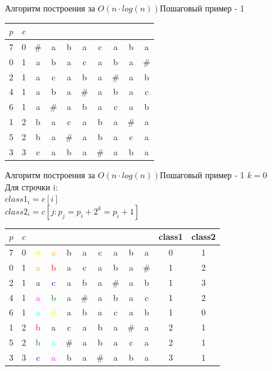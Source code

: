 \documentclass[10pt]{beamer}
\begin{document}
\begin{frame}[fragile]{Алгоритм построения за $O(n \cdot log(n))$}{Пошаговый пример - 1}
\begin{center}
\begin{tabular}{ c|c|cccccccc } 
 $p$ & $c$ & & & & & & & & \\ 
  \hline
 7 & 0 & \# & a & b & a & c & a & b & a \\ 
 \hline
 0 & 1 & a & b & a & c & a & b & a & \# \\ 
 \hline
 2 & 1 & a & c & a & b & a & \# & a & b \\ 
 \hline
 4 & 1 & a & b & a & \# & a & b & a & c \\ 
 \hline
 6 & 1 & a & \# & a & b & a & c & a & b \\ 
 \hline
 1 & 2 & b & a & c & a & b & a & \# & a \\ 
 \hline
 5 & 2 & b & a & \# & a & b & a & c & a \\ 
 \hline
 3 & 3 & c & a & b & a & \# & a & b & a \\ 
\end{tabular}
\end{center}
\end{frame}

\begin{frame}[fragile]{Алгоритм построения за $O(n \cdot log(n))$}{Пошаговый пример - 1}
$k = 0$\\
Для строчки i: \\
$class1_i = c[i]$ \\
$class2_i = c[j: p_j=p_i+2^k=p_i+1]$ \\
\begin{center}
\begin{tabular}{ c|c|cccccccc|c|c } 
 $p$ & $c$ & & & & & & & & & class1 & class2 \\ 
  \hline
 7 & 0 & \textcolor{yellow}{\#} & \textcolor{orange}{a} & b & a & c & a & b & a & 0 & 1 \\ 
 \hline
 0 & 1 & \textcolor{orange}{a} & \textcolor{red}{b} & a & c & a & b & a & \# & 1 & 2 \\ 
 \hline
 2 & 1 & a & \textcolor{blue}{c} & a & b & a & \# & a & b & 1 & 3 \\ 
 \hline
 4 & 1 & \textcolor{magenta}{a} & \textcolor{green}{b} & a & \# & a & b & a & c & 1 & 2 \\ 
 \hline
 6 & 1 & \textcolor{cyan}{a} & \textcolor{yellow}{\#} & a & b & a & c & a & b & 1 & 0 \\ 
 \hline
 1 & 2 & \textcolor{red}{b} & a & c & a & b & a & \# & a & 2 & 1 \\ 
 \hline
 5 & 2 & \textcolor{green}{b} & \textcolor{cyan}{a} & \# & a & b & a & c & a & 2 & 1 \\ 
 \hline
 3 & 3 & \textcolor{blue}{c} & \textcolor{magenta}{a} & b & a & \# & a & b & a & 3 & 1 \\ 
\end{tabular}
\end{center}
\end{frame}
\end{document}
